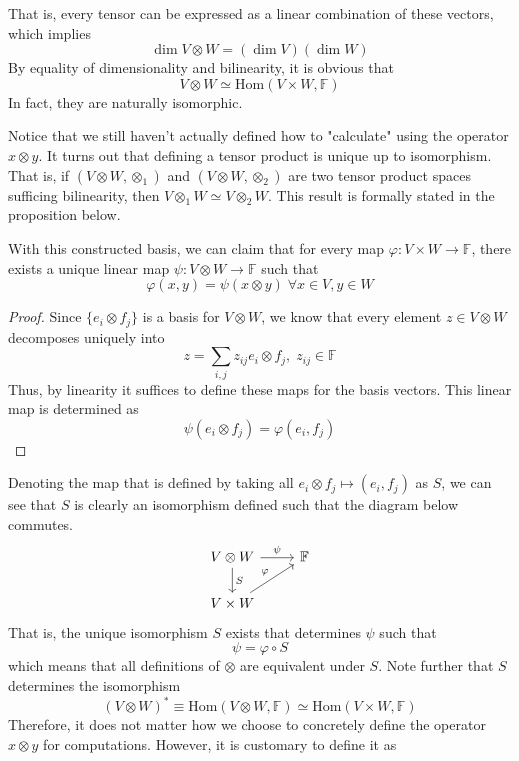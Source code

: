   That is, every tensor can be expressed as a linear combination of these vectors, which implies
  \[\dim{V \otimes W} = (\dim{V}) (\dim{W})\]
  By equality of dimensionality and bilinearity, it is obvious that
  \[V \otimes W \simeq \text{Hom}(V \times W, \mathbb{F})\]
  In fact, they are naturally isomorphic. 

  Notice that we still haven't actually defined how to "calculate" using the operator $x \otimes y$. It turns out that defining a tensor product is unique up to isomorphism. That is, if $(V \otimes W, \otimes_1)$ and $(V \otimes W, \otimes_2)$ are two tensor product spaces sufficing bilinearity, then $V \otimes_1 W \simeq V \otimes_2 W$. This result is formally stated in the proposition below. 

  \begin{proposition}
  With this constructed basis, we can claim that for every map $\varphi: V \times W \longrightarrow \mathbb{F}$, there exists a unique linear map $\psi: V \otimes W \longrightarrow \mathbb{F}$ such that 
  \[\varphi (x, y) = \psi (x \otimes y) \; \forall x \in V, y \in W\]
  \end{proposition}
  \begin{proof}
  Since $\{e_i \otimes f_j\}$ is a basis for $V \otimes W$, we know that every element $z \in V \otimes W$ decomposes uniquely into 
  \[z = \sum_{i, j} z_{i j} e_i \otimes f_j, \; z_{i j} \in \mathbb{F}\]
  Thus, by linearity it suffices to define these maps for the basis vectors. This linear map is determined as 
  \[\psi (e_i \otimes f_j) = \varphi (e_i, f_j)\]
  \end{proof}
  Denoting the map that is defined by taking all $e_i \otimes f_j \mapsto (e_i, f_j)$ as $S$, we can see that $S$ is clearly an isomorphism defined such that the diagram below commutes. 
  \[\begin{tikzcd}
      V \otimes W \arrow{r}{\psi} \arrow{d}{S} & \mathbb{F} \\
      V \times W \arrow{ru}{\varphi}
  \end{tikzcd}\]
  That is, the unique isomorphism $S$ exists that determines $\psi$ such that 
  \[\psi = \varphi \circ S \] 
  which means that all definitions of $\otimes$ are equivalent under $S$. Note further that $S$ determines the isomorphism 
  \[(V \otimes W)^* \equiv \text{Hom}(V \otimes W, \mathbb{F}) \simeq \text{Hom}(V \times W, \mathbb{F})\]
  Therefore, it does not matter how we choose to concretely define the operator $x \otimes y$ for computations. However, it is customary to define it as
